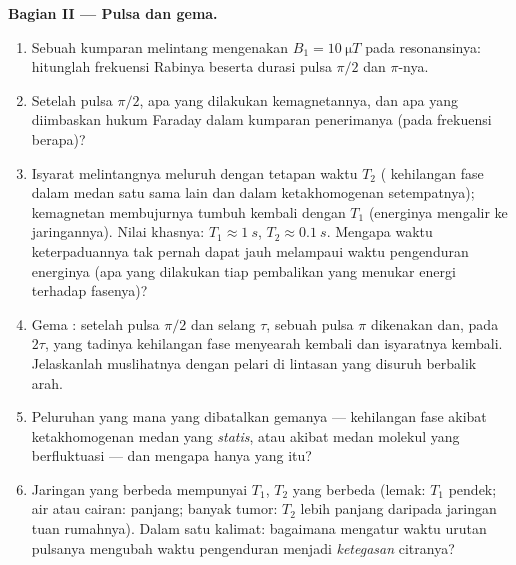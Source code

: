 \begin{problem}
\medskip\noindent\textbf{Bagian II --- Pulsa dan gema.}
\begin{enumerate}[resume]
  \item Sebuah kumparan melintang mengenakan $B_1 = \qty{10}{\micro T}$
        pada resonansinya: hitunglah frekuensi Rabinya beserta durasi
        pulsa $\pi/2$ dan $\pi$-nya.
  \item Setelah pulsa $\pi/2$, apa yang dilakukan kemagnetannya, dan apa
        yang diimbaskan hukum Faraday dalam kumparan penerimanya (pada
        frekuensi berapa)?
  \item Isyarat melintangnya meluruh dengan tetapan waktu $T_2$
        ( kehilangan fase dalam medan satu sama lain dan dalam
        ketakhomogenan setempatnya); kemagnetan membujurnya tumbuh
        kembali dengan $T_1$ (energinya mengalir ke jaringannya). Nilai
        khasnya: $T_1 \approx \qty{1}{s}$, $T_2 \approx \qty{0.1}{s}$.
        Mengapa waktu keterpaduannya tak pernah dapat jauh melampaui
        waktu pengenduran energinya (apa yang dilakukan tiap pembalikan
        yang menukar energi terhadap fasenya)?
  \item Gema : setelah pulsa $\pi/2$ dan selang $\tau$, sebuah pulsa
        $\pi$ dikenakan dan, pada $2\tau$,  yang tadinya kehilangan
        fase menyearah kembali dan isyaratnya kembali. Jelaskanlah
        muslihatnya dengan pelari di lintasan yang disuruh berbalik arah.
  \item Peluruhan yang mana yang dibatalkan gemanya --- kehilangan fase
        akibat ketakhomogenan medan yang \emph{statis}, atau akibat
        medan molekul yang berfluktuasi --- dan mengapa hanya yang itu?
  \item Jaringan yang berbeda mempunyai $T_1$, $T_2$ yang berbeda
        (lemak: $T_1$ pendek; air atau cairan: panjang; banyak tumor:
        $T_2$ lebih panjang daripada jaringan tuan rumahnya). Dalam satu
        kalimat: bagaimana mengatur waktu urutan pulsanya mengubah waktu
        pengenduran menjadi \emph{ketegasan} citranya?
\end{enumerate}


\end{problem}

